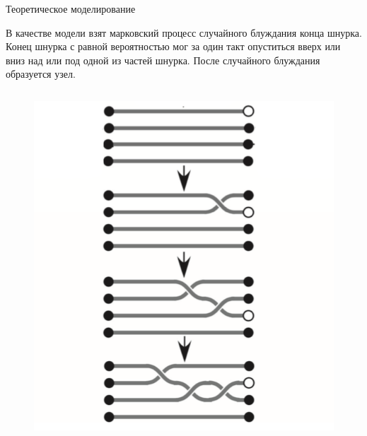 \begin{frame}{Теоретическое моделирование}

	\begin{block}{}
		В качестве модели взят марковский процесс случайного блуждания конца шнурка.
		Конец шнурка с равной вероятностью мог за один такт опуститься вверх или вниз над или под одной из частей шнурка.
		После случайного блуждания образуется узел.
	\end{block}

	\begin{columns}

		\begin{column}{0.4\linewidth}
			\begin{figure}[H]
				\includegraphics[width=1\linewidth]{img/hnurki_zaput.png}
			\end{figure}

		\end{column}

%
%
%

	\end{columns}

\end{frame}

